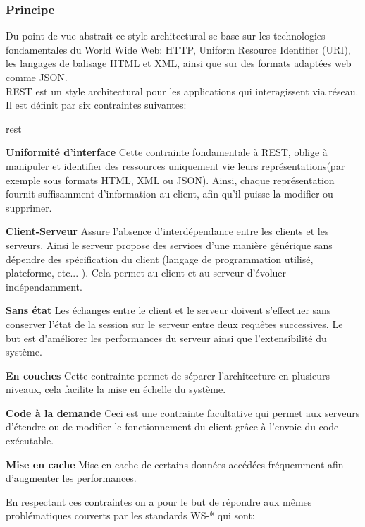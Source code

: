 \subsubsection{Principe}
Du point de vue abstrait ce style architectural se base sur les technologies fondamentales du World Wide Web: HTTP, Uniform Resource Identifier (URI),  les langages de balisage HTML et XML, ainsi que sur des formats adaptées web comme JSON.\\
REST est un style architectural pour les applications qui interagissent via réseau. Il est définit par six contraintes suivantes: 
\begin{labeling}{rest}
	
\item [\textbf{Uniformité d'interface}] Cette contrainte fondamentale à REST, oblige à manipuler et identifier des ressources uniquement vie leurs représentations(par exemple sous formats HTML, XML ou JSON). Ainsi, chaque représentation fournit suffisamment d'information au client, afin qu'il puisse la modifier ou supprimer.

\item [\textbf{Client-Serveur}] Assure l'absence d'interdépendance entre les clients et les serveurs. Ainsi le serveur propose des services d'une manière générique sans dépendre des spécification du client (langage de programmation utilisé, plateforme, etc... ). Cela permet au client et au serveur d'évoluer indépendamment. 


\item [\textbf{Sans état}] Les échanges entre le client et le serveur doivent s'effectuer sans conserver l'état de la session sur le serveur entre deux requêtes successives. Le but est d'améliorer les performances du serveur ainsi que l'extensibilité du système. 

\item [\textbf{En couches}] Cette contrainte permet de séparer l'architecture en plusieurs niveaux, cela facilite la mise en échelle du système. 
\item [\textbf{Code à la demande}] Ceci est une contrainte facultative qui permet aux serveurs d'étendre ou de modifier le fonctionnement du client grâce à l'envoie du code exécutable.
\item [\textbf{Mise en cache}] Mise en cache de certains données accédées fréquemment afin d'augmenter les performances.

\end{labeling}
 En respectant ces contraintes on a pour le but de répondre aux mêmes problématiques couverts par les standards WS-* qui sont:
